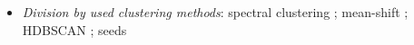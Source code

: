 \begin{itemize}
\begin{itemize}
\begin{itemize}


\item \emph{Division by used clustering methods}: spectral clustering \cite{liang2018proposal}; mean-shift \cite{kong2018recurrent}; HDBSCAN \cite{}; seeds \cite{fathi2017semantic} 
\end{itemize}





\end{itemize}
\end{itemize}
